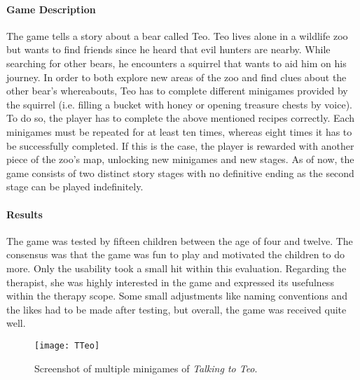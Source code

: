 \documentclass[draft,final]{vutinfth} %
\begin{document}
\paragraph{Game Description}
The game tells a story about a bear called Teo. Teo lives alone in a wildlife zoo but wants to find friends since he heard that evil hunters are nearby. While searching for other bears, he encounters a squirrel that wants to aid him on his journey. In order to both explore new areas of the zoo and find clues about the other bear's whereabouts, Teo has to complete different minigames provided by the squirrel (i.e. filling a bucket with honey or opening treasure chests by voice). To do so, the player has to complete the above mentioned recipes correctly. Each minigames must be repeated for at least ten times, whereas eight times it has to be successfully completed. If this is the case, the player is rewarded with another piece of the zoo's map, unlocking new minigames and new stages. As of now, the game consists of two distinct story stages with no definitive ending as the second stage can be played indefinitely.

\paragraph{Results}
The game was tested by fifteen children between the age of four and twelve. The consensus was that the game was fun to play and motivated the children to do more. Only the usability took a small hit within this evaluation.
Regarding the therapist, she was highly interested in the game and expressed its usefulness within the therapy scope. Some small adjustments like naming conventions and the likes had to be made after testing, but overall, the game was received quite well.
\begin{figure}
\begin{center}
\texttt{[image: TTeo]}
\end{center}
\caption{Screenshot of multiple minigames of \emph{Talking to Teo}\cite{navarro2014talking}.}
\end{figure}
\end{document}
